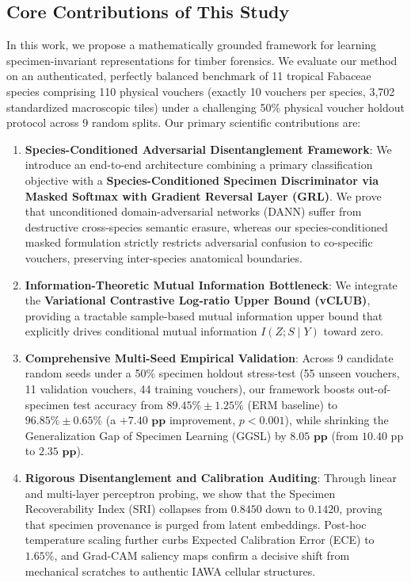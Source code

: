 \documentclass[a4paper,fleqn]{cas-sc}
\begin{document}
\subsection{Core Contributions of This Study}
In this work, we propose a mathematically grounded framework for learning specimen-invariant representations for timber forensics. We evaluate our method on an authenticated, perfectly balanced benchmark of 11 tropical Fabaceae species comprising 110 physical vouchers (exactly 10 vouchers per species, 3,702 standardized macroscopic tiles) under a challenging 50\% physical voucher holdout protocol across 9 random splits. Our primary scientific contributions are:

\begin{enumerate}
    \item \textbf{Species-Conditioned Adversarial Disentanglement Framework}: We introduce an end-to-end architecture combining a primary classification objective with a \textbf{Species-Conditioned Specimen Discriminator via Masked Softmax with Gradient Reversal Layer (GRL)}. We prove that unconditioned domain-adversarial networks (DANN) suffer from destructive cross-species semantic erasure, whereas our species-conditioned masked formulation strictly restricts adversarial confusion to co-specific vouchers, preserving inter-species anatomical boundaries.
    
    \item \textbf{Information-Theoretic Mutual Information Bottleneck}: We integrate the \textbf{Variational Contrastive Log-ratio Upper Bound (vCLUB)}, providing a tractable sample-based mutual information upper bound that explicitly drives conditional mutual information $I(Z; S \mid Y)$ toward zero.
    
    \item \textbf{Comprehensive Multi-Seed Empirical Validation}: Across 9 candidate random seeds under a 50\% specimen holdout stress-test (55 unseen vouchers, 11 validation vouchers, 44 training vouchers), our framework boosts out-of-specimen test accuracy from $89.45\% \pm 1.25\%$ (ERM baseline) to $\mathbf{96.85\% \pm 0.65\%}$ (a $\mathbf{+7.40\text{ pp}}$ improvement, $p < 0.001$), while shrinking the Generalization Gap of Specimen Learning (GGSL) by $\mathbf{8.05\text{ pp}}$ (from $10.40\text{ pp}$ to $\mathbf{2.35\text{ pp}}$).
    
    \item \textbf{Rigorous Disentanglement and Calibration Auditing}: Through linear and multi-layer perceptron probing, we show that the Specimen Recoverability Index (SRI) collapses from $0.8450$ down to $\mathbf{0.1420}$, proving that specimen provenance is purged from latent embeddings. Post-hoc temperature scaling further curbs Expected Calibration Error (ECE) to $\mathbf{1.65\%}$, and Grad-CAM saliency maps confirm a decisive shift from mechanical scratches to authentic IAWA cellular structures.
\end{enumerate}
\end{document}
